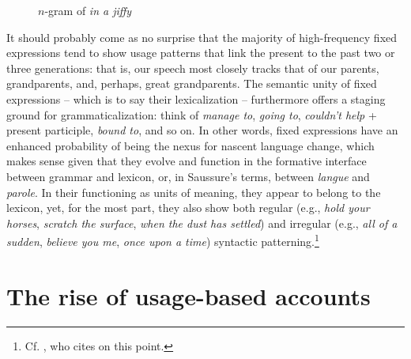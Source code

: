 \documentclass[english,output=paper,colorlinks,citecolor=brown]{../langscibook}
\begin{document}
\begin{figure}
\caption{$n$-gram of \textit{in a jiffy}\label{fig:6:3}} %
\end{figure}

It should probably come as no surprise that the majority of high-frequency fixed expressions tend to show usage patterns that link the present to the past two or three generations: that is, our speech most closely tracks that of our parents, grandparents, and, perhaps, great grandparents. The semantic unity of fixed expressions – which is to say their lexicalization – furthermore offers a staging ground for grammaticalization: think of \textit{manage to}, \textit{going to}, \textit{couldn’t help} + present participle, \textit{bound to}, and so on. In other words, fixed expressions have an enhanced probability of being the nexus for nascent language change, which makes sense given that they evolve and function in the formative interface between grammar and lexicon, or, in Saussure’s terms, between \textit{langue} and \textit{parole}. In their functioning as units of meaning, they appear to belong to the lexicon, yet, for the most part, they also show both regular (e.g., \textit{hold your horses}, \textit{scratch the surface}, \textit{when the dust has settled}) and irregular (e.g., \textit{all of a sudden}, \textit{believe you me}, \textit{once upon a time}) syntactic patterning.\footnote{Cf. \citet[2--3]{Wood2002}, who cites \citet[36]{RichardsSchmidt1983} on this point.}

\section{The rise of usage-based accounts}
\end{document}

